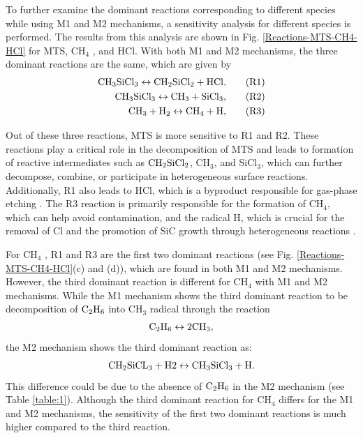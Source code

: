\documentclass[final, letterpaper, square, comma, numbers, sort&compress]{elsarticle}
\begin{document}
To further examine the dominant reactions corresponding to different species while using M1 and M2 mechanisms, a sensitivity analysis for different species is performed. The results from this analysis are shown in Fig. \ref{Reactions-MTS-CH4-HCl} for MTS, CH$_4$ , and HCl. With both M1 and M2 mechanisms, the three dominant reactions are the same, which are given by
\begin{align} %
    \rm CH_3SiCl_3 \leftrightarrow CH_2SiCl_2 + HCl, & \tag{R1} \\
    \rm CH_3SiCl_3 \leftrightarrow CH_3 + SiCl_3, & \tag{R2} \\
    \rm CH_3 + H_2 \leftrightarrow CH_4 + H, & \tag{R3}
\end{align}

\noindent Out of these three reactions, MTS is more sensitive to R1 and R2. These reactions play a critical role in the decomposition of MTS and leads to formation of reactive intermediates such as $\rm CH_2SiCl_2$, CH$_3$, and SiCl$_3$, which can further decompose, combine, or participate in heterogeneous surface reactions. Additionally, R1 also leads to HCl, which is a byproduct responsible for gas-phase etching \cite{Wang2008,Guan2020}. The R3 reaction is primarily responsible for the formation of CH$_4$, which can help avoid contamination, and the radical H, which is crucial for the removal of Cl and the promotion of SiC growth through heterogeneous reactions \cite{Brennan1990}. 

For CH$_4$ , R1 and R3 are the first two dominant reactions (see Fig. \ref{Reactions-MTS-CH4-HCl}(c) and (d)), which are found in both M1 and M2 mechanisms. However, the third dominant reaction is different for CH$_4$ with M1 and M2 mechanisms. While the M1 mechanism shows the third dominant reaction to be decomposition of $\rm C_2H_6$ into CH$_3$ radical through the reaction
\begin{align*}
    \rm C_2H_6 \leftrightarrow 2CH_3,
\end{align*}
the M2 mechanism shows the third dominant reaction as:
\begin{align*}
    \rm CH_2SiCL_3 + H2 \leftrightarrow CH_3SiCl_3 + H.
\end{align*}
This difference could be due to the absence of $\rm C_2H_6$ in the M2 mechanism (see Table \ref{table:1}). Although the third dominant reaction for CH$_4$ differs for the M1 and M2 mechanisms, the sensitivity of the first two dominant reactions is much higher compared to the third reaction.
\end{document}
